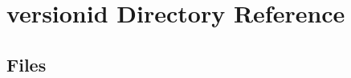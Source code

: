 \section{versionid Directory Reference}
\label{dir_003862c0b1d6a4e8ae76692cdaaff39d}
\subsection*{Files}
\begin{DoxyCompactItemize}
\end{DoxyCompactItemize}
